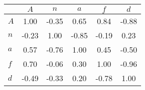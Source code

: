 \begin{tabular}{lccccc}
\toprule
 & $A$ & $n$ & $a$ & $f$ & $d$ \\
\midrule
$A$ & {\cellcolor[HTML]{2C1A4C}} \color[HTML]{F1F1F1} 1.00 & {\cellcolor[HTML]{C1C18A}} \color[HTML]{000000} -0.35 & {\cellcolor[HTML]{346191}} \color[HTML]{F1F1F1} 0.65 & {\cellcolor[HTML]{29386A}} \color[HTML]{F1F1F1} 0.84 & {\cellcolor[HTML]{3C3D14}} \color[HTML]{F1F1F1} -0.88 \\
$n$ & {\cellcolor[HTML]{D7D7AE}} \color[HTML]{000000} -0.23 & {\cellcolor[HTML]{2C1A4C}} \color[HTML]{F1F1F1} 1.00 & {\cellcolor[HTML]{434319}} \color[HTML]{F1F1F1} -0.85 & {\cellcolor[HTML]{DEDEBD}} \color[HTML]{000000} -0.19 & {\cellcolor[HTML]{AABED2}} \color[HTML]{000000} 0.23 \\
$a$ & {\cellcolor[HTML]{45719C}} \color[HTML]{F1F1F1} 0.57 & {\cellcolor[HTML]{59592A}} \color[HTML]{F1F1F1} -0.76 & {\cellcolor[HTML]{2C1A4C}} \color[HTML]{F1F1F1} 1.00 & {\cellcolor[HTML]{688CB0}} \color[HTML]{F1F1F1} 0.45 & {\cellcolor[HTML]{999960}} \color[HTML]{F1F1F1} -0.50 \\
$f$ & {\cellcolor[HTML]{2C5586}} \color[HTML]{F1F1F1} 0.70 & {\cellcolor[HTML]{EDEEDF}} \color[HTML]{000000} -0.06 & {\cellcolor[HTML]{92ACC6}} \color[HTML]{F1F1F1} 0.30 & {\cellcolor[HTML]{2C1A4C}} \color[HTML]{F1F1F1} 1.00 & {\cellcolor[HTML]{2E2E08}} \color[HTML]{F1F1F1} -0.96 \\
$d$ & {\cellcolor[HTML]{9D9D63}} \color[HTML]{F1F1F1} -0.49 & {\cellcolor[HTML]{C5C58F}} \color[HTML]{000000} -0.33 & {\cellcolor[HTML]{B3C5D7}} \color[HTML]{000000} 0.20 & {\cellcolor[HTML]{555527}} \color[HTML]{F1F1F1} -0.78 & {\cellcolor[HTML]{2C1A4C}} \color[HTML]{F1F1F1} 1.00 \\
\bottomrule
\end{tabular}
